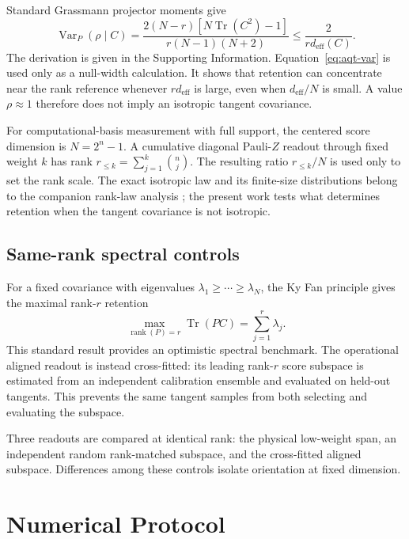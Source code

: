 \documentclass[ASNA,twocolumn]{USG}
\begin{document}
Standard Grassmann projector moments give
\begin{equation}
\operatorname{Var}_P(\rho\mid C)=
\frac{2(N-r)\left[N\operatorname{Tr}(C^2)-1\right]}
{r(N-1)(N+2)}
\le \frac{2}{r d_{\mathrm{eff}}(C)}.
\label{eq:aqt-var}
\end{equation}
The derivation is given in the Supporting Information. Equation~\eqref{eq:aqt-var} is used only as a null-width calculation. It shows that retention can concentrate near the rank reference whenever $r d_{\mathrm{eff}}$ is large, even when $d_{\mathrm{eff}}/N$ is small. A value $\rho\approx1$ therefore does not imply an isotropic tangent covariance.

For computational-basis measurement with full support, the centered score dimension is $N=2^n-1$. A cumulative diagonal Pauli-$Z$ readout through fixed weight $k$ has rank $r_{\le k}=\sum_{j=1}^k\binom nj$. The resulting ratio $r_{\le k}/N$ is used only to set the rank scale. The exact isotropic law and its finite-size distributions belong to the companion rank-law analysis \cite{AitHaddou2026IsotropicRankLaws}; the present work tests what determines retention when the tangent covariance is not isotropic.

\subsection{Same-rank spectral controls}

For a fixed covariance with eigenvalues $\lambda_1\ge\cdots\ge\lambda_N$, the Ky Fan principle gives the maximal rank-$r$ retention
\begin{equation}
 \max_{\operatorname{rank}(P)=r}\operatorname{Tr}(PC)
 =\sum_{j=1}^{r}\lambda_j.
\label{eq:aqt-kyfan}
\end{equation}
This standard result \cite{KyFan1949} provides an optimistic spectral benchmark. The operational aligned readout is instead cross-fitted: its leading rank-$r$ score subspace is estimated from an independent calibration ensemble and evaluated on held-out tangents. This prevents the same tangent samples from both selecting and evaluating the subspace.

Three readouts are compared at identical rank: the physical low-weight span, an independent random rank-matched subspace, and the cross-fitted aligned subspace. Differences among these controls isolate orientation at fixed dimension.

\section{Numerical Protocol}
\end{document}
